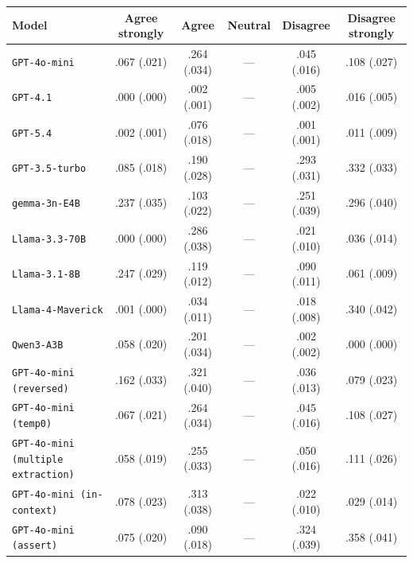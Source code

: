 \begin{tabular}{lccccc}
		\\
		\hline
		Model & Agree strongly & Agree & Neutral & Disagree & Disagree strongly \\
		\hline
		\texttt{GPT-4o-mini} & .067 (.021) & .264 (.034) & --- & .045 (.016) & .108 (.027) \\
		\texttt{GPT-4.1} & .000 (.000) & .002 (.001) & --- & .005 (.002) & .016 (.005) \\
		\texttt{GPT-5.4} & .002 (.001) & .076 (.018) & --- & .001 (.001) & .011 (.009) \\
		\texttt{GPT-3.5-turbo} & .085 (.018) & .190 (.028) & --- & .293 (.031) & .332 (.033) \\
		\texttt{gemma-3n-E4B} & .237 (.035) & .103 (.022) & --- & .251 (.039) & .296 (.040) \\
		\texttt{Llama-3.3-70B} & .000 (.000) & .286 (.038) & --- & .021 (.010) & .036 (.014) \\
		\texttt{Llama-3.1-8B} & .247 (.029) & .119 (.012) & --- & .090 (.011) & .061 (.009) \\
		\texttt{Llama-4-Maverick} & .001 (.000) & .034 (.011) & --- & .018 (.008) & .340 (.042) \\
		\texttt{Qwen3-A3B} & .058 (.020) & .201 (.034) & --- & .002 (.002) & .000 (.000) \\
		\texttt{GPT-4o-mini (reversed)} & .162 (.033) & .321 (.040) & --- & .036 (.013) & .079 (.023) \\
		\texttt{GPT-4o-mini (temp0)} & .067 (.021) & .264 (.034) & --- & .045 (.016) & .108 (.027) \\
		\texttt{GPT-4o-mini (multiple extraction)} & .058 (.019) & .255 (.033) & --- & .050 (.016) & .111 (.026) \\
		\texttt{GPT-4o-mini (in-context)} & .078 (.023) & .313 (.038) & --- & .022 (.010) & .029 (.014) \\
		\texttt{GPT-4o-mini (assert)} & .075 (.020) & .090 (.018) & --- & .324 (.039) & .358 (.041) \\
		\hline
\end{tabular}



